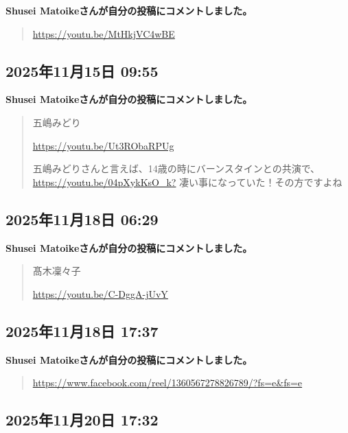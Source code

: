 \textbf{Shusei Matoikeさんが自分の投稿にコメントしました。}

\begin{quote}
\url{https://youtu.be/MtHkjVC4wBE}
\end{quote}

\subsection*{2025年11月15日 09:55}

\textbf{Shusei Matoikeさんが自分の投稿にコメントしました。}

\begin{quote}
五嶋みどり

\url{https://youtu.be/Ut3RObaRPUg}

五嶋みどりさんと言えば、14歳の時にバーンスタインとの共演で、\url{https://youtu.be/04pXykKsO_k?} 凄い事になっていた！その方ですよね
\end{quote}

\subsection*{2025年11月18日 06:29}

\textbf{Shusei Matoikeさんが自分の投稿にコメントしました。}

\begin{quote}
髙木凜々子

\url{https://youtu.be/C-DggA-jUvY}
\end{quote}

\subsection*{2025年11月18日 17:37}

\textbf{Shusei Matoikeさんが自分の投稿にコメントしました。}

\begin{quote}
\url{https://www.facebook.com/reel/1360567278826789/?fs=e&fs=e}
\end{quote}

\subsection*{2025年11月20日 17:32}

